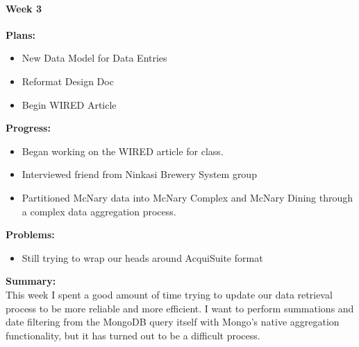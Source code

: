 \paragraph{Week 3}
\begin{adjustwidth}{2.5em}{0pt}
    \vspace{-0.5cm}\textbf{Plans:}
    \vspace{-0.5cm}
    \begin{itemize}
        \item New Data Model for Data Entries
        \item Reformat Design Doc
        \item Begin WIRED Article
    \end{itemize} 
    \vspace{-0.3cm}\textbf{Progress:}
    \vspace{-0.5cm}
    \begin{itemize}
        \item Began working on the WIRED article for class.
        \item Interviewed friend from Ninkasi Brewery System group
        \item Partitioned McNary data into McNary Complex and McNary Dining through a complex data aggregation process. %
    
    \end{itemize} 
    \vspace{-0.3cm}\textbf{Problems:}
    \vspace{-0.5cm}
    \begin{itemize}
        \item Still trying to wrap our heads around AcquiSuite format
    \end{itemize}  
    \vspace{-0.3cm}\noindent\textbf{Summary:}\\
    \noindent This week I spent a good amount of time trying to update our data retrieval process to be more reliable and more efficient. I want to perform summations and date filtering from the MongoDB query itself with Mongo's native aggregation functionality, but it has turned out to be a difficult process. 
\end{adjustwidth} 
